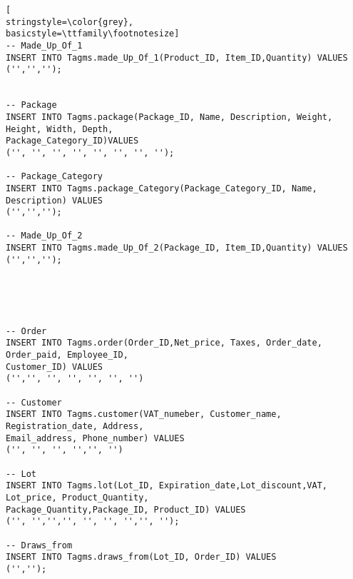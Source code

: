 \begin{lstlisting}[
stringstyle=\color{grey},
basicstyle=\ttfamily\footnotesize]
-- Made_Up_Of_1
INSERT INTO Tagms.made_Up_Of_1(Product_ID, Item_ID,Quantity) VALUES
('','','');


-- Package
INSERT INTO Tagms.package(Package_ID, Name, Description, Weight, Height, Width, Depth, 
Package_Category_ID)VALUES
('', '', '', '', '', '', '', '');

-- Package_Category
INSERT INTO Tagms.package_Category(Package_Category_ID, Name, Description) VALUES 
('','','');

-- Made_Up_Of_2
INSERT INTO Tagms.made_Up_Of_2(Package_ID, Item_ID,Quantity) VALUES
('','','');





-- Order
INSERT INTO Tagms.order(Order_ID,Net_price, Taxes, Order_date, Order_paid, Employee_ID, 
Customer_ID) VALUES 
('','', '', '', '', '', '')

-- Customer
INSERT INTO Tagms.customer(VAT_numeber, Customer_name, Registration_date, Address, 
Email_address, Phone_number) VALUES
('', '', '', '','', '')

-- Lot
INSERT INTO Tagms.lot(Lot_ID, Expiration_date,Lot_discount,VAT, Lot_price, Product_Quantity, 
Package_Quantity,Package_ID, Product_ID) VALUES 
('', '','','', '', '', '','', '');

-- Draws_from
INSERT INTO Tagms.draws_from(Lot_ID, Order_ID) VALUES 
('','');

\end{lstlisting}
